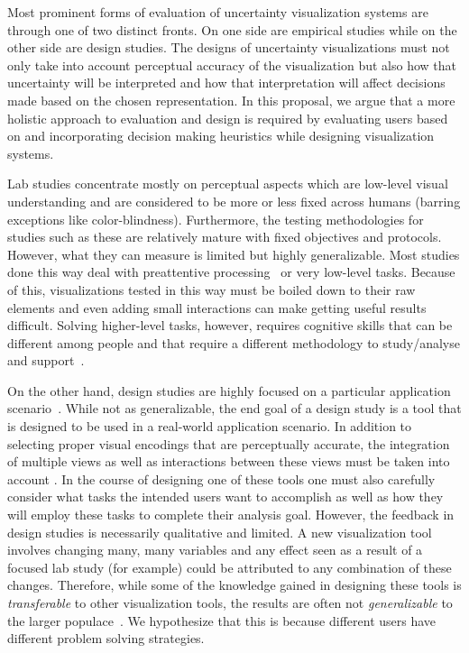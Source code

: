 
Most prominent forms of evaluation of uncertainty visualization systems 
are through one of two distinct fronts.
On one side are empirical studies while on the other side are design studies.
The designs of uncertainty visualizations must not only take into account 
perceptual accuracy of the visualization but also how that uncertainty will
be interpreted and how that interpretation will affect decisions made based
on the chosen representation. In this proposal,
we argue that a more holistic approach to evaluation and design is required
by evaluating users based on and incorporating decision making heuristics
while designing visualization systems.

Lab studies concentrate mostly on perceptual aspects which are low-level visual
understanding and are considered to be more or less fixed across humans
(barring exceptions like color-blindness). Furthermore, the testing
methodologies for studies such as these are relatively mature with fixed
objectives and protocols. However, what they can measure is limited but highly
generalizable. Most studies done this way deal with preattentive 
processing~\citep{McGrath:1995} or
very low-level tasks. Because of this, visualizations tested in this way must be
boiled down to their raw elements and even adding small interactions can make
getting useful results difficult.  
Solving higher-level tasks, however, requires cognitive 
skills that can be different among people and that require a different 
methodology to study/analyse and support~\citep{Frensch:2005}.

On the other hand, design studies are highly focused on a particular
application scenario~\citep{Sedlmair:2012}. While not as generalizable, the end goal of a design
study is a tool that is designed to be used in a real-world application
scenario. In addition to selecting proper visual encodings that are
perceptually accurate, the integration of multiple views as well as
interactions between these views must be taken into account
. In the course of
designing one of these tools one must also carefully consider what tasks the
intended users want to accomplish as well as how they will employ these tasks
to complete their analysis goal. However, the feedback in design studies is
necessarily qualitative and limited. A new visualization tool involves changing
many, many variables and any effect seen as a result of a focused lab study
(for example) could be attributed to any combination of these changes.
Therefore, while some of the knowledge gained in designing these tools is
\emph{transferable} to other visualization tools, the results are often not
\emph{generalizable} to the larger populace~.
We hypothesize that this is because different
users have different problem solving strategies. 


